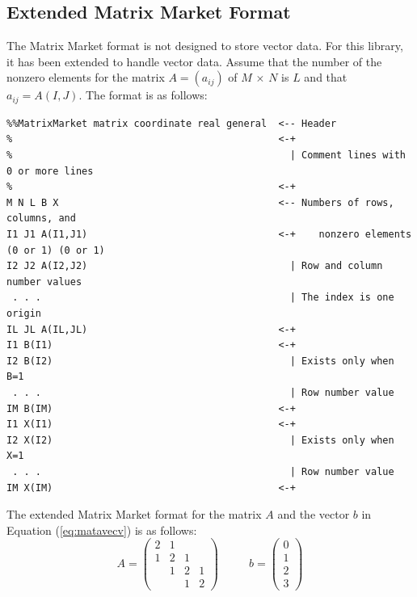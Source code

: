 \documentclass[a4paper]{article}
\begin{document}
\subsection{Extended Matrix Market Format}
The Matrix Market format\cite{matrixmarket} is not designed to store
vector data. For this library, it has been extended to 
handle vector data. Assume that the number of the nonzero elements for the matrix $A=(a_{ij})$ of $M$ $\times$ $N$ is $L$ and 
that $a_{ij} = A(I,J)$. The format is as follows: 

{\small
\begin{verbatim}
%%MatrixMarket matrix coordinate real general  <-- Header
%                                              <-+ 
%                                                | Comment lines with 0 or more lines
%                                              <-+
M N L B X                                      <-- Numbers of rows, columns, and 
I1 J1 A(I1,J1)                                 <-+    nonzero elements (0 or 1) (0 or 1)
I2 J2 A(I2,J2)                                   | Row and column number values
 . . .                                           | The index is one origin
IL JL A(IL,JL)                                 <-+
I1 B(I1)                                       <-+
I2 B(I2)                                         | Exists only when B=1
 . . .                                           | Row number value
IM B(IM)                                       <-+
I1 X(I1)                                       <-+
I2 X(I2)                                         | Exists only when X=1
 . . .                                           | Row number value
IM X(IM)                                       <-+
\end{verbatim}
}

The extended Matrix Market format for the matrix $A$ and the vector $b$ in Equation (\ref{eq:matavecv}) is as follows: 
\begin{equation}
A = 
\left(
\begin{array}{cccc}
2 & 1 &   &    \\
1 & 2 & 1 &    \\ 
  & 1 & 2 & 1 \\
  &   & 1 & 2 
\end{array}
\right)
~~~~~~~~~~~~
b = 
\left(
\begin{array}{c}
0 \\
1 \\ 
2 \\
3  
\end{array}
\right)
\label{eq:matavecv}
\end{equation}
\end{document}
